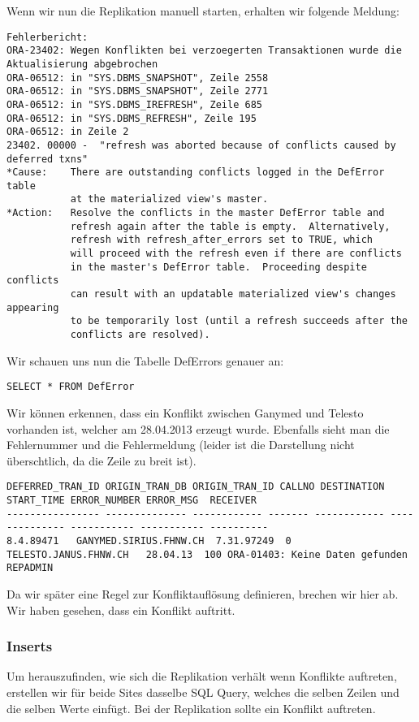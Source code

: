 \documentclass[11pt,a4paper,parskip=half]{scrartcl}
\begin{document}
Wenn wir nun die Replikation manuell starten, erhalten wir folgende Meldung:
\begin{lstlisting}
Fehlerbericht:
ORA-23402: Wegen Konflikten bei verzoegerten Transaktionen wurde die Aktualisierung abgebrochen
ORA-06512: in "SYS.DBMS_SNAPSHOT", Zeile 2558
ORA-06512: in "SYS.DBMS_SNAPSHOT", Zeile 2771
ORA-06512: in "SYS.DBMS_IREFRESH", Zeile 685
ORA-06512: in "SYS.DBMS_REFRESH", Zeile 195
ORA-06512: in Zeile 2
23402. 00000 -  "refresh was aborted because of conflicts caused by deferred txns"
*Cause:    There are outstanding conflicts logged in the DefError table
           at the materialized view's master.
*Action:   Resolve the conflicts in the master DefError table and
           refresh again after the table is empty.  Alternatively,
           refresh with refresh_after_errors set to TRUE, which
           will proceed with the refresh even if there are conflicts
           in the master's DefError table.  Proceeding despite conflicts
           can result with an updatable materialized view's changes appearing
           to be temporarily lost (until a refresh succeeds after the
           conflicts are resolved).
\end{lstlisting}

Wir schauen uns nun die Tabelle DefErrors genauer an:
\begin{lstlisting}
SELECT * FROM DefError
\end{lstlisting}

Wir können erkennen, dass ein Konflikt zwischen Ganymed und Telesto vorhanden ist, welcher am 28.04.2013 erzeugt wurde. Ebenfalls sieht man die Fehlernummer und die Fehlermeldung (leider ist die Darstellung nicht überschtlich, da die Zeile zu breit ist).
\begin{lstlisting}
DEFERRED_TRAN_ID ORIGIN_TRAN_DB ORIGIN_TRAN_ID CALLNO DESTINATION START_TIME ERROR_NUMBER ERROR_MSG  RECEIVER
---------------- -------------- ------------ ------- ------------ -------------- ----------- ----------- ----------
8.4.89471   GANYMED.SIRIUS.FHNW.CH  7.31.97249  0 TELESTO.JANUS.FHNW.CH   28.04.13  100 ORA-01403: Keine Daten gefunden  REPADMIN
\end{lstlisting}

Da wir später eine Regel zur Konfliktauflösung definieren, brechen wir hier ab. Wir haben gesehen, dass ein Konflikt auftritt.

\subsubsection{Inserts}
Um herauszufinden, wie sich die Replikation verhält wenn Konflikte auftreten, erstellen wir für beide Sites dasselbe SQL Query, welches die selben Zeilen und die selben Werte einfügt. Bei der Replikation sollte ein Konflikt auftreten.
\end{document}
